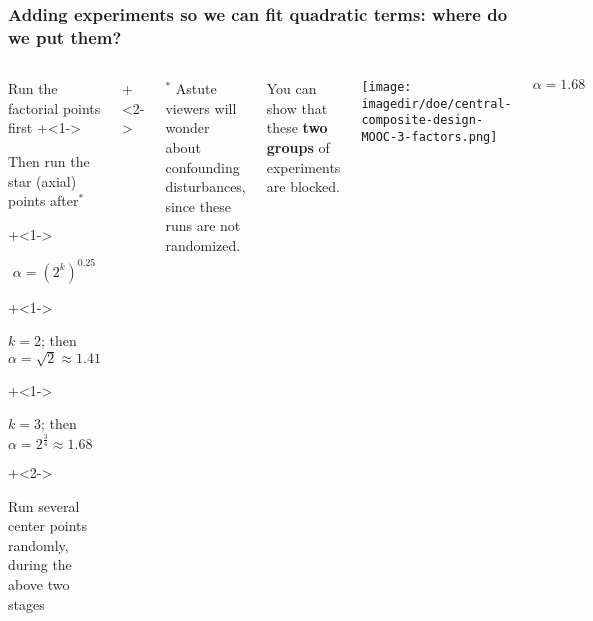 \begin{frame}\frametitle{Adding experiments so we can fit quadratic terms: where do we put them?}
	\begin{columns}[T]
		
			\vspace{1cm}
			
			\begin{itemize}
				\item	Run the factorial points first
				\onslide+<1->{
					\item	Then run the star (axial) points after$^\ast$
				}
				\onslide+<1->{
					\Large
					\[\alpha  = \left(2^k\right)^{0.25}\]
					
			
					\begin{itemize}
						\onslide+<1->{\item	$k = 2$; then $\alpha = \sqrt{2} \approx 1.41$ }
						\onslide+<1->{\item	$k = 3$; then $\alpha = 2^{\tfrac{3}{4}} \approx 1.68$}
					\end{itemize}
					\normalsize
				}
				\onslide+<2->{
					\item	Run several center points randomly, during the above two stages
				}
			\end{itemize}
			
			\onslide+<2->{
				\vspace{0cm}
				\tiny
				$^\ast$ Astute viewers will wonder about confounding disturbances, since these runs are not randomized.
			
				You can show that these {\color[rgb]{0,0.5,1}\textbf{two}} {\color[rgb]{0.5,0, 0.5}\textbf{groups}} of experiments are blocked.
			}
			
			
			\centerline{\texttt{[image: \\imagedir/doe/central-composite-design-MOOC-3-factors.png]}}
			
			\vspace{-0.5cm}
			\[\alpha = 1.68\]
	\end{columns}
\end{frame}

